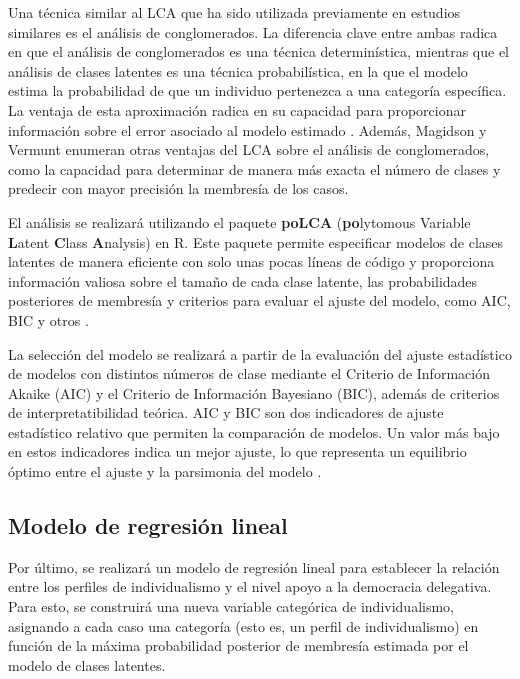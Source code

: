 \documentclass[12pt,twoside]{templates/facsothesis}
\begin{document}
Una técnica similar al LCA que ha sido utilizada previamente en estudios similares \citep{rojas2008} es el análisis de conglomerados. La diferencia clave entre ambas radica en que el análisis de conglomerados es una técnica determinística, mientras que el análisis de clases latentes es una técnica probabilística, en la que el modelo estima la probabilidad de que un individuo pertenezca a una categoría específica. La ventaja de esta aproximación radica en su capacidad para proporcionar información sobre el error asociado al modelo estimado \citep{magidson2002}. Además, Magidson y Vermunt \citeyearpar{magidson2002} enumeran otras ventajas del LCA sobre el análisis de conglomerados, como la capacidad para determinar de manera más exacta el número de clases y predecir con mayor precisión la membresía de los casos.

El análisis se realizará utilizando el paquete \textbf{poLCA} (\textbf{po}lytomous Variable \textbf{L}atent \textbf{C}lass \textbf{A}nalysis) en R. Este paquete permite especificar modelos de clases latentes de manera eficiente con solo unas pocas líneas de código y proporciona información valiosa sobre el tamaño de cada clase latente, las probabilidades posteriores de membresía y criterios para evaluar el ajuste del modelo, como AIC, BIC y otros \citep{linzer2011}.

La selección del modelo se realizará a partir de la evaluación del ajuste estadístico de modelos con distintos números de clase mediante el Criterio de Información Akaike (AIC) y el Criterio de Información Bayesiano (BIC), además de criterios de interpretatibilidad teórica. AIC y BIC son dos indicadores de ajuste estadístico relativo que permiten la comparación de modelos. Un valor más bajo en estos indicadores indica un mejor ajuste, lo que representa un equilibrio óptimo entre el ajuste y la parsimonia del modelo \citep{collins2010}.

\hypertarget{modelo-de-regresiuxf3n-lineal}{%
\subsection{Modelo de regresión lineal}\label{modelo-de-regresiuxf3n-lineal}}

Por último, se realizará un modelo de regresión lineal para establecer la relación entre los perfiles de individualismo y el nivel apoyo a la democracia delegativa. Para esto, se construirá una nueva variable categórica de individualismo, asignando a cada caso una categoría (esto es, un perfil de individualismo) en función de la máxima probabilidad posterior de membresía estimada por el modelo de clases latentes.
\end{document}
